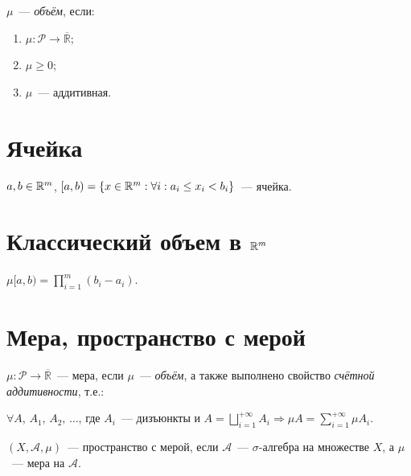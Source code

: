 \documentclass{article}
\begin{document}
        $\mu$~--- \textit{объём}, если:
        
        \begin{enumerate}
        
            \item $\mu : \mathcal{P} \rightarrow \overline{\mathbb{R}}$;
            
            \item $\mu \geq 0$;
            
            \item $\mu$~--- аддитивная.
            
        \end{enumerate}
        
    \newpage
    
    \section{Ячейка}
    
        $a, b \in \mathbb{R}^m$, $[a, b) = \left\{ x \in \mathbb{R}^m : \forall i : a_i \leq x_i < b_i \right\}$~--- ячейка.
        
    \newpage
    
    \section{Классический объем в $\mathbb{R}^m$}
    
        $\mu [a, b) = \prod\limits^m_{i = 1} (b_i - a_i)$.
        
    \newpage
    
    \section{Мера, пространство с мерой}
            
        $\mu : \mathcal{P} \rightarrow \overline{\mathbb{R}}$~--- мера, если $\mu$~--- \textit{объём}, а также выполнено свойство \textit{счётной аддитивности}, т.е.:
        
        $\forall A$, $A_1$, $A_2$, $\ldots$, где $A_i$~--- дизъюнкты и $A = \bigsqcup\limits^{+\infty}_{i = 1} A_i \Rightarrow \mu A = \sum\limits^{+\infty}_{i = 1} \mu A_i$.
        
        $(X, \mathcal{A}, \mu)$~--- пространство с мерой, если $\mathcal{A}$~--- $\sigma$-алгебра на множестве $X$, а $\mu$~--- мера на $\mathcal{A}$.
        
    \newpage
    
\end{document}
